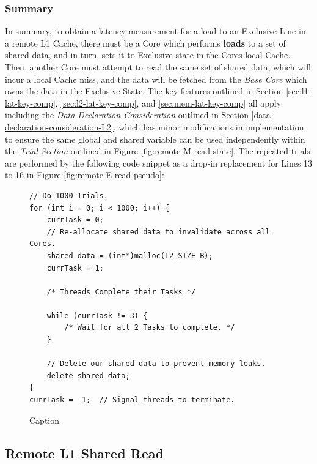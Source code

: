 \documentclass[bsc,frontabs,twoside,singlespacing,parskip,deptreport]{infthesis}     %
\begin{document}
\subsubsection{Summary}
In summary, to obtain a latency measurement for a load to an Exclusive Line in a remote L1 Cache, there must be a Core which performs \textbf{loads} to a set of shared data, and in turn, sets it to Exclusive state in the Cores local Cache. Then, another Core must attempt to read the same set of shared data, which will incur a local Cache miss, and the data will be fetched from the \emph{Base Core} which owns the data in the Exclusive State. The key features outlined in Section \ref{sec:l1-lat-key-comp}, \ref{sec:l2-lat-key-comp}, and \ref{sec:mem-lat-key-comp} all apply including the \textit{Data Declaration Consideration} outlined in Section \ref{data-declaration-consideration-L2}, which has minor modifications in implementation to ensure the same global and shared variable can be used independently within the \textit{Trial Section} outlined in Figure \ref{fig:remote-M-read-state}. The repeated trials are performed by the following code snippet as a drop-in replacement for Lines 13 to 16 in Figure \ref{fig:remote-E-read-pseudo}:
\begin{figure}[!h]
    \centering
    \begin{minipage}{0.8\textwidth}
    \begin{verbatim}
// Do 1000 Trials.
for (int i = 0; i < 1000; i++) {
    currTask = 0;
    // Re-allocate shared data to invalidate across all Cores.
    shared_data = (int*)malloc(L2_SIZE_B);
    currTask = 1;

    /* Threads Complete their Tasks */
        
    while (currTask != 3) {
        /* Wait for all 2 Tasks to complete. */
    }

    // Delete our shared data to prevent memory leaks.
    delete shared_data;
}
currTask = -1;  // Signal threads to terminate.
    \end{verbatim}
    \end{minipage}
    \caption{Caption}
    \label{fig:remote-E-repeat}
\end{figure}

\subsection{Remote L1 Shared Read}\label{sec:shared-read}
\end{document}
